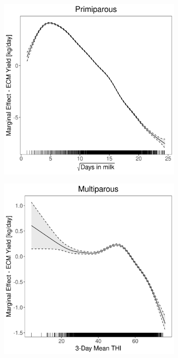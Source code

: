 \begin{figure}[H]
\begin{subfigure}[b]{0.45\textwidth}
    \end{subfigure}
    \hspace{0.05\textwidth} %
    \begin{subfigure}[b]{0.45\textwidth}
        \centering
        \includegraphics[width=\textwidth]{thesis/figures/models/ecm/after2010/ho_ecm_after2010/ho_ecm_after2010_marginal_dim_milk_primi.png}
    \end{subfigure}
    \begin{subfigure}[b]{0.45\textwidth}
        \centering
        \includegraphics[width=\textwidth]{thesis/figures/models/ecm/after2010/ho_ecm_after2010/ho_ecm_after2010_marginal_thi_milk_multi.png}

\end{subfigure}
\end{figure}
